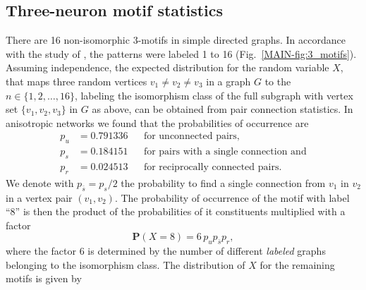 \subsection{Three-neuron motif statistics}

There are 16 %
non-isomorphic 3-motifs %
in simple directed graphs. In accordance with the study of
\textcite{Song2005}, the patterns were labeled 1 to 16
(Fig.~\ref{MAIN-fig:3_motifs}). Assuming independence, the expected
distribution for the random variable $X$, that maps three random
vertices $v_1 \neq v_2 \neq v_3$ in a graph $G$ to the
$n \in \{1,2,\dots,16\}$, labeling the isomorphism class of the full
subgraph with vertex set $\{v_1,v_2,v_3\}$ in $G$ as above, can be
obtained from pair connection statistics. In anisotropic networks we
found that the probabilities of occurrence are
\begin{align*} 
  p_u & = 0.791336     &&\text{for unconnected pairs,}     \\
  p_s & = 0.184151     &&\text{for pairs with a single connection and} \\
  p_r & = 0.024513     &&\text{for reciprocally connected pairs.}
\end{align*}
We denote with $p_{\bar{s}} = p_s/2$ the probability to find a single
connection from $v_1$ in $v_2$ in a vertex pair $(v_1,v_2)$. The
probability of occurrence of the motif with label \enquote{8} is then
the product of the probabilities of it constituents multiplied with a
factor
\[
  \mathbf{P}(X=8) = 6\, p_{u} p_{\bar{s}} p_{r},
\]
where the factor 6 is determined by the number of different
\textit{labeled} graphs belonging to the isomorphism class. The
distribution of $X$ for the remaining motifs is given by \\
%
\smallskip
%
